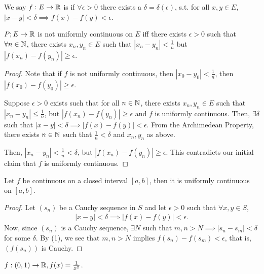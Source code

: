 \documentclass{book}
\begin{document}
\begin{defn}
    We say $f: E \to \mathbb{R}$ is  if $\forall \epsilon > 0$ there exists a $\delta = \delta(\epsilon)$, s.t. for all $x, y \in E$, $|x - y| < \delta \implies f(x) - f(y) < \epsilon$.
\end{defn}

\begin{lemma}
    $P ; E \to \mathbb{R}$ is not uniformly continuous on $E$ iff there exists $\epsilon > 0$ such that $\forall n \in \mathbb{N}$, there exists $x_n, y_n \in E$ such that $|x_n - y_n| < \frac{1}{n}$ but $|f(x_n) - f(y_n)| \geq \epsilon$.
\end{lemma}

\begin{proof}
    Note that if $f$ is not uniformly continuous, then $|x_0 - y_0| < \frac{1}{n}$, then $|f(x_0) - f(y_0)| \geq \epsilon$.

    Suppose $\epsilon > 0$ exists such that for all $n \in \mathbb{N}$, there exists $x_n, y_n \in E$ such that $|x_n - y_n| \leq \frac{1}{n}$, but $|f(x_n) - f(y_n)| \geq \epsilon$ and $f$ is uniformly continuous. Then, $\exists \delta$ such that $|x - y| < \delta \implies |f(x) - f(y)| < \epsilon$. From the Archimedean Property, there exists $n \in \mathbb{N}$ such that $\frac{1}{n} < \delta$ and $x_n, y_n$ as above.

    Then, $|x_n - y_n| < \frac{1}{n} < \delta$, but $|f(x_n) - f(y_n)| \geq \epsilon$. This contradicts our initial claim that $f$ is uniformly continuous.
\end{proof}

\begin{thm}
    Let $f$ be continuous on a closed interval $[a, b]$, then it is uniformly continuous on $[a, b]$. 
\end{thm}

\begin{proof}
    Let $(s_n)$ be a Cauchy sequence in $S$ and let $\epsilon > 0$ such that $\forall x, y \in S$,
    \begin{align}
        |x - y| < \delta \implies |f(x) - f(y)| < \epsilon.
    \end{align}
    Now, since $(s_n)$ is a Cauchy sequence, $\exists N$ such that $m, n > N \implies |s_n - s_m| < \delta$ for some $\delta$. By (1), we see that $m, n > N$ implies $f(s_n) - f(s_m) < \epsilon$, that is, $(f(s_n))$ is Cauchy.
\end{proof}

\begin{ex}
    $f : (0, 1) \to \mathbb{R}, f(x) = \frac{1}{x^2}$.
\end{ex}
\end{document}
